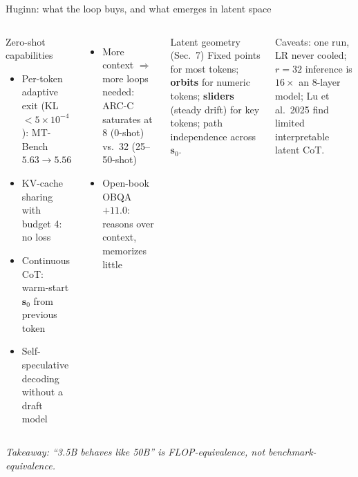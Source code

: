 \documentclass[aspectratio=169,10pt]{beamer}
\newcommand{\pos}[1]{\textcolor{positive}{#1}}
\newcommand{\con}[1]{\textcolor{negative}{#1}}
\begin{document}
\begin{frame}{Huginn: what the loop buys, and what emerges in latent space}
  \begin{columns}[T]
      \begin{block}{Zero-shot capabilities}
        \begin{itemize}
          \item Per-token adaptive exit (KL $< 5{\times}10^{-4}$): MT-Bench $5.63 \to 5.56$
          \item KV-cache sharing with budget 4: no loss
          \item Continuous CoT: warm-start $\mathbf{s}_0$ from previous token
          \item Self-speculative decoding without a draft model
        \end{itemize}
      \end{block}
      \begin{itemize}
        \item More context $\Rightarrow$ more loops needed: ARC-C saturates at 8 (0-shot) vs.\ 32 (25--50-shot)
        \item Open-book OBQA $+11.0$: \pos{reasons over context}, \con{memorizes little}
      \end{itemize}
      \begin{exampleblock}{Latent geometry (Sec.~7)}
        Fixed points for most tokens; \textbf{orbits} for numeric tokens; \textbf{sliders} (steady drift) for key tokens; path independence across $\mathbf{s}_0$.
      \end{exampleblock}
      \con{Caveats:} one run, LR never cooled; $r{=}32$ inference is $16\times$ an 8-layer model; Lu et al.\ 2025 find limited interpretable latent CoT.
  \end{columns}
  \vspace{4pt}
  \textit{Takeaway: ``3.5B behaves like 50B'' is FLOP-equivalence, not benchmark-equivalence.}
\end{frame}
\end{document}
